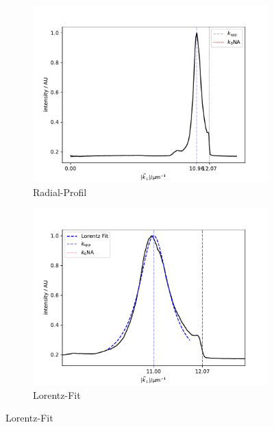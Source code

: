 \documentclass[titlepage]{article}
\begin{document}
	\begin{figure}[h!]
		\label{fig:dirt_measure}
		\centering
		\begin{subfigure}[b]{0.5\textwidth}
			\centering
			\includegraphics[width=\textwidth]{figures/dirt_radial.pdf}
			\caption{Radial-Profil}
			\label{fig:dirt_radial}
		\end{subfigure}
		\hfill
		\begin{subfigure}[b]{0.49\textwidth}
			\centering
			\includegraphics[width=\textwidth]{figures/dirt_lorentz.pdf}
			\caption{Lorentz-Fit}
			\label{fig:dirt_lorentz}
		\end{subfigure}
	

\end{figure}
\end{document}
